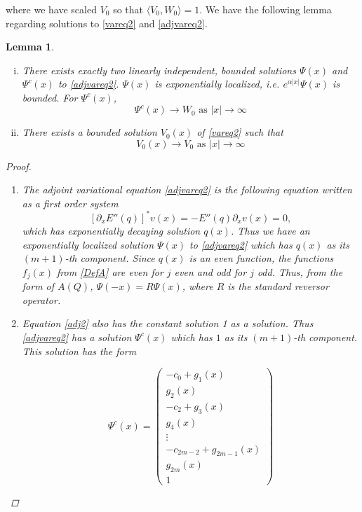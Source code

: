\documentclass[12pt]{article}
\newtheorem{lemma}{Lemma}
\begin{document}
where we have scaled $V_0$ so that $\langle V_0, W_0 \rangle = 1$. We have the following lemma regarding solutions to \eqref{vareq2} and \eqref{adjvareq2}.

\begin{lemma}\label{varadjsolutions}
\begin{enumerate}[(i)]

\item There exists exactly two linearly independent, bounded solutions $\Psi(x)$ and $\Psi^c(x)$ to \eqref{adjvareq2}. $\Psi(x)$ is exponentially localized, i.e. $e^{\alpha |x|}\Psi(x)$ is bounded. For $\Psi^c(x)$,
	\begin{equation}
	\Psi^c(x) \rightarrow W_0 \text{ as }|x| \rightarrow \infty
	\end{equation}

\item There exists a bounded solution $V_0(x)$ of \eqref{vareq2} such that 
\begin{equation}
V_0(x) \rightarrow V_0 \text{ as }|x| \rightarrow \infty
\end{equation}
\end{enumerate}

\begin{proof}

\begin{enumerate}
\item The adjoint variational equation \eqref{adjvareq2} is the following equation written as a first order system
\begin{equation}\label{adj2}
[\partial_x E''(q) ]^* v(x) = -E''(q) \partial_x v(x) = 0,
\end{equation}
which has exponentially decaying solution $q(x)$. Thus we have an exponentially localized solution $\Psi(x)$ to \eqref{adjvareq2} which has $q(x)$ as its $(m+1)$-th component. Since $q(x)$ is an even function, the functions $f_j(x)$ from \eqref{DefA} are even for $j$ even and odd for $j$ odd. Thus, from the form of $A(Q)$, $\Psi(-x) = R \Psi(x)$, where $R$ is the standard reversor operator.

\item Equation \eqref{adj2} also has the constant solution 1 as a solution. Thus \eqref{adjvareq2} has a solution $\Psi^c(x)$ which has $1$ as its $(m+1)$-th component. This solution has the form

\[
\Psi^c(x) = \begin{pmatrix}
-c_0 + g_1(x) \\ g_2(x) \\
-c_2 + g_3(x) \\ g_4(x) \\
\vdots \\
-c_{2m-2} + g_{2m-1}(x) \\ g_{2m}(x) \\ 1
\end{pmatrix}
\]


\end{enumerate}
\end{proof}
\end{lemma}
\end{document}
